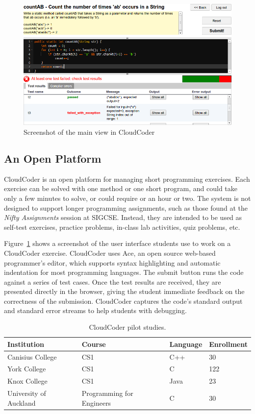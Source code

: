 \documentclass{sig-alternate}
\begin{document}
\begin{figure}
\centering
\includegraphics[width=5.25in]{images/screenshot4}
\caption{Screenshot of the main view in CloudCoder}
\label{screenshot}
\end{figure}


\subsection{An Open Platform}

CloudCoder is an open platform for managing short programming
exercises.
Each exercise can be solved with one method or one short
program, and could take only a few minutes to solve, or could require
or an hour or two.  The system is not designed to support longer
programming assignments, such as those found at the {\em Nifty
Assignments} session at SIGCSE\cite{Parlante:2013:NA:2445196.2445356}.
Instead, they are intended to be used as self-test exercises,
practice problems, in-class lab activities, quiz problems, etc.

Figure~\ref{screenshot} shows a screenshot of the user interface
students use to work on a CloudCoder exercise.
CloudCoder uses Ace\cite{ace}, an open source web-based
programmer's editor, which supports
syntax highlighting and automatic indentation for most programming languages.
The submit button runs the code against a series of
test cases. Once the test results are received, they are presented
directly in the browser, giving the student immediate feedback on the
correctness of the submission.
CloudCoder captures the code's standard output and
standard error streams to help students with debugging.

\begin{table}
\centering
\begin{tabular}{llll}
\toprule
Institution & Course & Language & Enrollment\\
\midrule
Canisius College & CS1 & C++ & 30\\
York College & CS1 & C & 122\\
Knox College & CS1 & Java & 23\\
University of Auckland & Programming for Engineers & C & 30\\
\bottomrule
\end{tabular}
\caption{CloudCoder pilot studies.}
\label{tab:courses}
\end{table}
\end{document}
